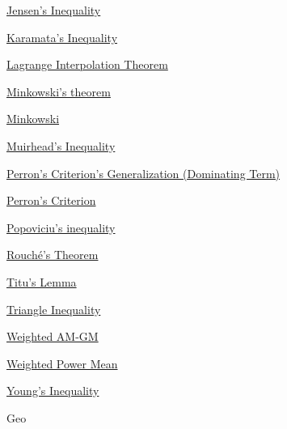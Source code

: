 \hyperref  [theorem:Jensen's Inequality]{Jensen's Inequality}

\hyperref  [theorem:Karamata's Inequality]{Karamata's Inequality}

\hyperref  [theorem:Lagrange Interpolation Theorem]{Lagrange Interpolation Theorem}

\hyperref  [theorem:Minkowski's theorem]{Minkowski's theorem}

\hyperref  [theorem:Minkowski]{Minkowski}

\hyperref  [theorem:Muirhead's Inequality]{Muirhead's Inequality}

\hyperref  [theorem:Perron's Criterion's Generalization (Dominating Term)]{Perron's Criterion's Generalization (Dominating Term)}

\hyperref  [theorem:Perron's Criterion]{Perron's Criterion}

\hyperref  [theorem:Popoviciu's inequality]{Popoviciu's inequality}

\hyperref  [theorem:Rouché's Theorem]{Rouché's Theorem}

\hyperref  [theorem:Titu's Lemma]{Titu's Lemma}

\hyperref  [theorem:Triangle Inequality]{Triangle Inequality}

\hyperref  [theorem:Weighted AM-GM]{Weighted AM-GM}

\hyperref  [theorem:Weighted Power Mean]{Weighted Power Mean}

\hyperref  [theorem:Young's Inequality]{Young's Inequality}


\newpage Geo


\hyperref  [lemma:]{}

\hyperref  [lemma:]{}

\hyperref  [lemma:]{}

\hyperref  [lemma:]{}

\hyperref  [lemma:]{}

\hyperref  [lemma:]{}

\hyperref  [lemma:]{}

\hyperref  [lemma:]{}

\hyperref  [lemma:]{}

\hyperref  [lemma:]{}

\hyperref  [lemma:]{}

\hyperref  [lemma:]{}

\hyperref  [lemma:]{}

\hyperref  [lemma:]{}

\hyperref  [lemma:]{}

\hyperref  [lemma:]{}

